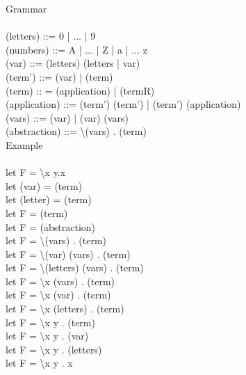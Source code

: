 \documentclass{article}
\begin{document}
Grammar \\
\\
(letters) ::= 0 | ... | 9 \\
(numbers) ::= A \;|\; ... \;|\; Z \;|\; a \;|\; ... z \\
(var) ::= (letters) (letters | var) \\
(term') ::= (var) | (term) \\
(term) :: = (application) | (termR) \\
(application) ::= (term') (term') | (term') (application) \\
(vars) ::= (var) | (var) (vars) \\
(abstraction) ::= \textbackslash (vars) . (term) \\

Example \\
\\
let F =  \textbackslash x y.x \\
let (var) = (term) \\
let (letter) = (term) \\
let F = (term) \\
let F = (abstraction) \\
let F = \textbackslash (vars) . (term) \\
let F = \textbackslash (var) (vars) . (term) \\
let F = \textbackslash (letters) (vars) . (term) \\
let F = \textbackslash x (vars) . (term) \\
let F = \textbackslash x (var) . (term) \\
let F = \textbackslash x (letters) . (term) \\
let F = \textbackslash x y . (term) \\
let F = \textbackslash x y . (var) \\
let F = \textbackslash x y . (letters) \\
let F =  \textbackslash x y . x \\
\end{document}
